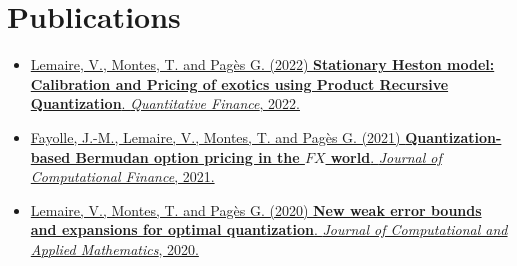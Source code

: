 \documentclass[]{deedy-resume-openfont}
\begin{document}
\hfill
\begin{minipage}[t]{0.59\textwidth}


	\section{Publications}
	\vspace{-0.1cm}
	\begin{itemize}
		\item[\diamond] \href{https://www.tandfonline.com/doi/abs/10.1080/14697688.2021.2023205?journalCode=rquf20}{Lemaire, V., Montes, T. and Pagès G. (2022) \textbf{Stationary Heston model: Calibration and Pricing of exotics using Product Recursive Quantization}. \textit{Quantitative Finance}, 2022.}

		\item[\diamond] \href{https://www.risk.net/journal-of-computational-finance/7869926/quantization-based-bermudan-option-pricing-in-the-foreign-exchange-world}{Fayolle, J.-M., Lemaire, V., Montes, T. and Pagès G. (2021) \textbf{Quantization-based Bermudan option pricing in the $FX$ world}. \textit{Journal of Computational Finance}, 2021.}

		\item[\diamond] \href{https://www.sciencedirect.com/science/article/abs/pii/S0377042719306752}{Lemaire, V., Montes, T. and Pagès G. (2020) \textbf{New weak error bounds and expansions for optimal quantization}. \textit{Journal of Computational and Applied Mathematics}, 2020.}
	\end{itemize}

	\vspace{-1.cm}
	\renewcommand\refname{\vskip -1.5em} %
	
	
	\nocite{*}

\end{minipage}
\end{document}
